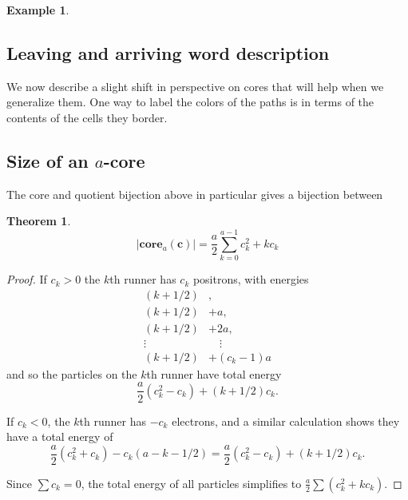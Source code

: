 \documentclass{amsart}[12pt]
\theoremstyle{definition}
\newtheorem{theorem}[dummy]{Theorem}
\newtheorem{example}[dummy]{Example}
\newcommand{\core}{\mathbf{core}}
\begin{document}
\begin{example}
\begin{center}
\end{center}
\end{example}



\subsection{Leaving and arriving word description}

We now describe a slight shift in perspective on cores that will help when we generalize them.  One way to label the colors of the paths is in terms of the contents of the cells they border.  



\subsection{Size of an \texorpdfstring{$a$}{a}-core}
The core and quotient bijection above in particular gives a bijection between 

\begin{theorem} \label{thm:quadratic}
$$|\core_a(\mathbf{c})|=\frac{a}{2}\sum_{k=0}^{a-1} c_k^2+ kc_k$$
\end{theorem}

\begin{proof}
 If  $c_k>0$ the $k$th runner has $c_k$ positrons, with
 energies 
\begin{align*}
(k+1/2)&,\\
(k+1/2)&+a, \\
(k+1/2)&+2a,\\
\vdots\quad &\quad \vdots \\
 (k+1/2)&+(c_k-1)a
\end{align*}
 and so the
 particles on the $k$th runner have total energy
 $$\frac{a}{2}(c_k^2-c_k)+(k+1/2)c_k.$$

 If $c_k<0$, the $k$th runner has $-c_k$ electrons, and a similar calculation shows they have a total energy of $$\frac{a}{2}(c_k^2+c_k)-c_k(a-k-1/2)=\frac{a}{2}(c_k^2-c_k)+(k+1/2)c_k.$$

Since $\sum c_k=0$, the total energy of all particles simplifies to $\frac{a}{2}\sum (c_k^2+kc_k)$.
\end{proof}
\end{document}
